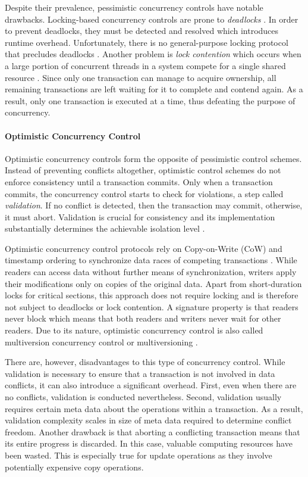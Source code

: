 Despite their prevalence, pessimistic concurrency controls have notable
drawbacks. Locking-based concurrency controls are prone to \emph{deadlocks}
\cite{bernstein1981concurrency, kung1981optimistic}. In order to prevent
deadlocks, they must be detected and resolved which introduces runtime overhead.
Unfortunately, there is no general-purpose locking protocol that precludes
deadlocks \cite{kung1981optimistic}. Another problem is \emph{lock contention}
which occurs when a large portion of concurrent threads in a system compete for
a single shared resource \cite{berenson1995critique, sadoghi2014reducing}. Since
only one transaction can manage to acquire ownership, all remaining transactions
are left waiting for it to complete and contend again. As a result, only one
transaction is executed at a time, thus defeating the purpose of concurrency.

\paragraph{Optimistic Concurrency Control}

Optimistic concurrency controls form the opposite of pessimistic control
schemes. Instead of preventing conflicts altogether, optimistic control schemes
do not enforce consistency until a transaction commits. Only when a transaction
commits, the concurrency control starts to check for violations, a step called
\emph{validation}. If no conflict is detected, then the transaction may commit,
otherwise, it must abort. Validation is crucial for consistency and its
implementation substantially determines the achievable isolation level
\cite{larson2011high}.

Optimistic concurrency control protocols rely on Copy-on-Write (CoW) and
timestamp ordering to synchronize data races of competing transactions
\cite{bernstein1981concurrency, kung1981optimistic}. While readers can access
data without further means of synchronization, writers apply their modifications
only on copies of the original data. Apart from short-duration locks for
critical sections, this approach does not require locking and is therefore not
subject to deadlocks or lock contention. A signature property is that readers
never block which means that both readers and writers never wait for other
readers. Due to its nature, optimistic concurrency control is also called
multiversion concurrency control or multiversioning
\cite{bernstein1983multiversion}.

There are, however, disadvantages to this type of concurrency control. While
validation is necessary to ensure that a transaction is not involved in data
conflicts, it can also introduce a significant overhead. First, even when there
are no conflicts, validation is conducted nevertheless. Second, validation
usually requires certain meta data about the operations within a transaction. As
a result, validation complexity scales in size of meta data required to
determine conflict freedom. Another drawback is that aborting a conflicting
transaction means that its entire progress is discarded. In this case, valuable
computing resources have been wasted. This is especially true for update
operations as they involve potentially expensive copy operations.

